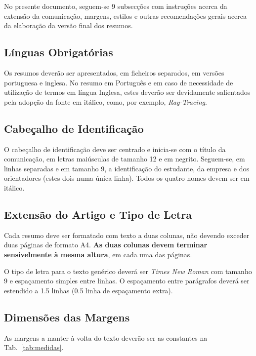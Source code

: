 \documentclass[9pt,a4paper]{extarticle}
\begin{document}
\begin{multicols}{2}
No presente documento, seguem-se 9 subsecções com instruções acerca da extensão da comunicação, margens, estilos e outras recomendações gerais acerca da elaboração da versão final dos resumos.

\subsection{Línguas Obrigatórias}\label{sec:lingua}

Os resumos deverão ser apresentados, em ficheiros separados, em versões portuguesa e inglesa.
No resumo em Português e em caso de necessidade de utilização de termos em língua Inglesa, estes deverão ser devidamente salientados pela adopção da fonte em itálico, como, por exemplo, \emph{Ray-Tracing}.

\subsection{Cabeçalho de Identificação}

O cabeçalho de identificação deve ser centrado e inicia-se com o título da comunicação, em letras maiúsculas de tamanho 12 e em negrito.
Seguem-se, em linhas separadas e em tamanho 9, a identificação do estudante, da empresa e dos orientadores (estes dois numa única linha).
Todos os quatro nomes devem ser em itálico.

\subsection{Extensão do Artigo e Tipo de Letra}

Cada resumo deve ser formatado com texto a duas colunas, não devendo exceder duas páginas de formato A4.
\textbf{As duas colunas devem terminar sensivelmente à mesma altura}, em cada uma das páginas.

O tipo de letra para o texto genérico deverá ser \emph{Times New Roman} com tamanho 9 e espaçamento simples entre linhas.
O espaçamento entre parágrafos deverá ser estendido a 1.5 linhas (0.5 linha de espaçamento extra).

\subsection{Dimensões das Margens}

As margens a manter à volta do texto deverão ser as constantes na Tab.~\ref{tab:medidas}.


\end{multicols}
\end{document}
